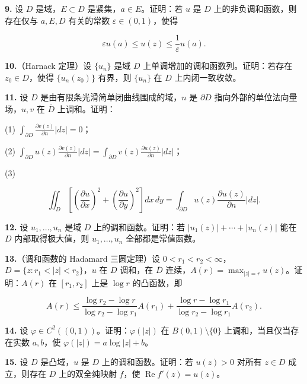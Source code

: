 \documentclass[11pt,a4paper]{article}
\begin{document}
\par{}
\noindent\textbf{9.} 设 \(D\) 是域，\(E\subset D\) 是紧集，\(a\in E\)。证明：若
\(u\) 是 \(D\) 上的非负调和函数，则存在仅与 \(a,E,D\) 有关的常数
\(\varepsilon\in(0,1)\)，使得

\[
\varepsilon u(a)\le u(z)\le\frac1\varepsilon u(a).
\]

\par{}
\noindent\textbf{10.}（Harnack 定理）设 \(\{u_n\}\) 是域 \(D\)
上单调增加的调和函数列。证明：若存在 \(z_0\in D\)，使得 \(\{u_n(z_0)\}\)
有界，则 \(\{u_n\}\) 在 \(D\) 上内闭一致收敛。

\par{}
\noindent\textbf{11.} 设 \(D\) 是由有限条光滑简单闭曲线围成的域，\(n\) 是
\(\partial D\) 指向外部的单位法向量场，\(u,v\) 在 \(\overline D\)
上调和。证明：

(1)
\(\displaystyle\int_{\partial D}\frac{\partial v(z)}{\partial n}|dz|=0\)；

(2)
\(\displaystyle\int_{\partial D}u(z)\frac{\partial v(z)}{\partial n}|dz|=\int_{\partial D}v(z)\frac{\partial u(z)}{\partial n}|dz|\)；

(3)

\[
\iint_D\left[\left(\frac{\partial u}{\partial x}\right)^2+\left(\frac{\partial u}{\partial y}\right)^2\right]dx\,dy
=\int_{\partial D}u(z)\frac{\partial u(z)}{\partial n}|dz|.
\]

\par{}
\noindent\textbf{12.} 设 \(u_1,\ldots,u_n\) 是域 \(D\) 上的调和函数。证明：若
\(|u_1(z)|+\cdots+|u_n(z)|\) 能在 \(D\) 内部取得极大值，则
\(u_1,\ldots,u_n\) 全部都是常值函数。

\par{}
\noindent\textbf{13.}（调和函数的 Hadamard 三圆定理）设
\(0<r_1<r_2<\infty\)，\(D=\{z:r_1<|z|<r_2\}\)，\(u\) 在 \(D\) 调和，在
\(\overline D\) 连续，\(A(r)=\max_{|z|=r}u(z)\)。证明：\(A(r)\) 在
\([r_1,r_2]\) 上是 \(\log r\) 的凸函数，即

\[
A(r)\le\frac{\log r_2-\log r}{\log r_2-\log r_1}A(r_1)
+\frac{\log r-\log r_1}{\log r_2-\log r_1}A(r_2).
\]

\par{}
\noindent\textbf{14.} 设 \(\varphi\in C^2((0,1))\)。证明：\(\varphi(|z|)\) 在
\(B(0,1)\setminus\{0\}\) 上调和，当且仅当存在实数 \(a,b\)，使
\(\varphi(|z|)=a\log|z|+b\)。

\par{}
\noindent\textbf{15.} 设 \(D\) 是凸域，\(u\) 是 \(D\) 上的调和函数。证明：若
\(u(z)>0\) 对所有 \(z\in D\) 成立，则存在 \(D\) 上的双全纯映射 \(f\)，使
\(\operatorname{Re}f'(z)=u(z)\)。
\end{document}
